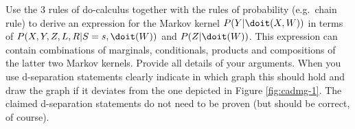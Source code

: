 Use the 3 rules of do-calculus together with the rules of probability (e.g.\ chain rule) to derive an expression for the Markov kernel $P(Y|\doit(X,W))$ in terms of $P(X,Y,Z,L,R|S=s,\doit(W))$ and $P(Z|\doit(W))$. This expression can contain combinations of marginals, conditionals, products and compositions of the latter two Markov kernels. 
Provide all details of your arguments.
When you use d-separation statements clearly indicate in which graph this should hold and draw the graph if it deviates from the one depicted in Figure \ref{fig:cadmg-1}.
The claimed d-separation statements do not need to be proven (but should be correct, of course).


